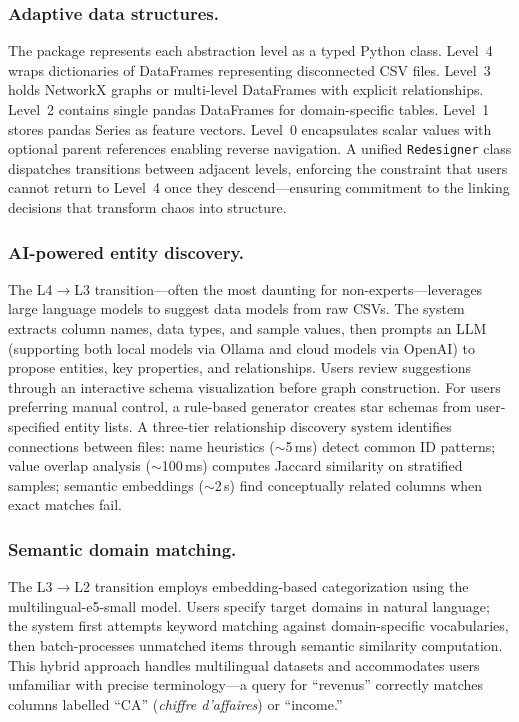 \documentclass[Afour,times,sageh]{sagej}
\begin{document}
\subsubsection{Adaptive data structures.}
The package represents each abstraction level as a typed Python class. Level~4 wraps dictionaries of DataFrames representing disconnected CSV files. Level~3 holds NetworkX graphs or multi-level DataFrames with explicit relationships. Level~2 contains single pandas DataFrames for domain-specific tables. Level~1 stores pandas Series as feature vectors. Level~0 encapsulates scalar values with optional parent references enabling reverse navigation. A unified \texttt{Redesigner} class dispatches transitions between adjacent levels, enforcing the constraint that users cannot return to Level~4 once they descend---ensuring commitment to the linking decisions that transform chaos into structure.

\subsubsection{AI-powered entity discovery.}
The L4$\to$L3 transition---often the most daunting for non-experts---leverages large language models to suggest data models from raw CSVs. The system extracts column names, data types, and sample values, then prompts an LLM (supporting both local models via Ollama and cloud models via OpenAI) to propose entities, key properties, and relationships. Users review suggestions through an interactive schema visualization before graph construction. For users preferring manual control, a rule-based generator creates star schemas from user-specified entity lists. A three-tier relationship discovery system identifies connections between files: name heuristics ($\sim$5\,ms) detect common ID patterns; value overlap analysis ($\sim$100\,ms) computes Jaccard similarity on stratified samples; semantic embeddings ($\sim$2\,s) find conceptually related columns when exact matches fail.

\subsubsection{Semantic domain matching.}
The L3$\to$L2 transition employs embedding-based categorization using the multilingual-e5-small model\cite{wang2024}. Users specify target domains in natural language; the system first attempts keyword matching against domain-specific vocabularies, then batch-processes unmatched items through semantic similarity computation. This hybrid approach handles multilingual datasets and accommodates users unfamiliar with precise terminology---a query for ``revenus'' correctly matches columns labelled ``CA'' (\textit{chiffre d'affaires}) or ``income.''
\end{document}
